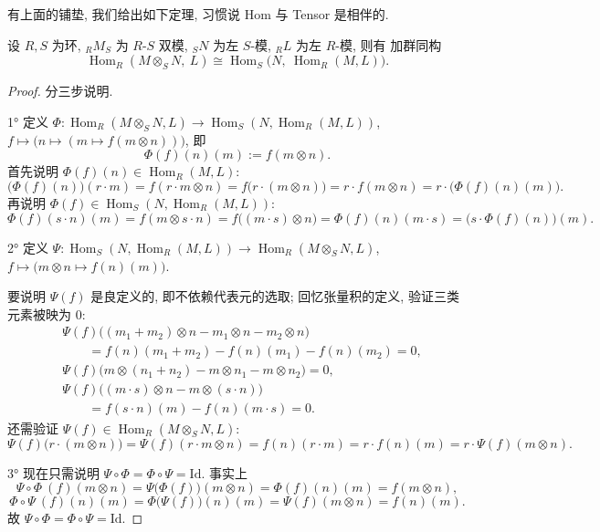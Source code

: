 有上面的铺垫, 我们给出如下定理, 习惯说 Hom 与 Tensor 是相伴的.

\begin{theorem}\label{thm:hom-tensor-adjunction}
设 $R,S$ 为环, ${}_R M_S$ 为 $R$-$S$ 双模, ${}_S N$ 为左 $S$-模, ${}_R L$ 为左 $R$-模, 则有
加群同构
\[
  \operatorname{Hom}_R(M\otimes_S N,\ L)\cong\operatorname{Hom}_S\bigl(N,\ \operatorname{Hom}_R(M,L)\bigr).
\]
\end{theorem}

\begin{proof}
分三步说明.

1° 定义 $\Phi\colon\operatorname{Hom}_R(M\otimes_S N,L)\to\operatorname{Hom}_S(N,\operatorname{Hom}_R(M,L))$,
$f\longmapsto\bigl(n\mapsto(m\mapsto f(m\otimes n))\bigr)$, 即
\[
  \Phi(f)(n)(m):=f(m\otimes n).
\]
首先说明 $\Phi(f)(n)\in\operatorname{Hom}_R(M,L)$:
\[
  \bigl(\Phi(f)(n)\bigr)(r\cdot m)=f(r\cdot m\otimes n)=f\bigl(r\cdot(m\otimes n)\bigr)
  =r\cdot f(m\otimes n)=r\cdot\bigl(\Phi(f)(n)(m)\bigr).
\]
再说明 $\Phi(f)\in\operatorname{Hom}_S(N,\operatorname{Hom}_R(M,L))$:
\[
  \Phi(f)(s\cdot n)(m)=f(m\otimes s\cdot n)=f\bigl((m\cdot s)\otimes n\bigr)
  =\Phi(f)(n)(m\cdot s)=\bigl(s\cdot\Phi(f)(n)\bigr)(m).
\]

2° 定义 $\Psi\colon\operatorname{Hom}_S(N,\operatorname{Hom}_R(M,L))\to\operatorname{Hom}_R(M\otimes_S N,L)$,
$f\longmapsto\bigl(m\otimes n\mapsto f(n)(m)\bigr)$.

要说明 $\Psi(f)$ 是良定义的, 即不依赖代表元的选取; 回忆张量积的定义, 验证三类元素被映为 $0$:
\[\begin{aligned}
  &\Psi(f)\bigl((m_1+m_2)\otimes n-m_1\otimes n-m_2\otimes n\bigr)\\
  &\qquad{}=f(n)(m_1+m_2)-f(n)(m_1)-f(n)(m_2)=0,\\
  &\Psi(f)\bigl(m\otimes(n_1+n_2)-m\otimes n_1-m\otimes n_2\bigr)=0,\\
  &\Psi(f)\bigl((m\cdot s)\otimes n-m\otimes(s\cdot n)\bigr)\\
  &\qquad{}=f(s\cdot n)(m)-f(n)(m\cdot s)=0 .
\end{aligned}\]
还需验证 $\Psi(f)\in\operatorname{Hom}_R(M\otimes_S N,L)$:
\[
  \Psi(f)\bigl(r\cdot(m\otimes n)\bigr)=\Psi(f)(r\cdot m\otimes n)=f(n)(r\cdot m)
  =r\cdot f(n)(m)=r\cdot\Psi(f)(m\otimes n).
\]

3° 现在只需说明 $\Psi\circ\Phi=\Phi\circ\Psi=\mathrm{Id}$. 事实上
\[
  \Psi\circ\Phi\ (f)(m\otimes n)=\Psi\bigl(\Phi(f)\bigr)(m\otimes n)=\Phi(f)(n)(m)=f(m\otimes n),
\]
\[
  \Phi\circ\Psi\ (f)(n)(m)=\Phi\bigl(\Psi(f)\bigr)(n)(m)=\Psi(f)(m\otimes n)=f(n)(m).
\]
故 $\Psi\circ\Phi=\Phi\circ\Psi=\mathrm{Id}$.
\end{proof}

